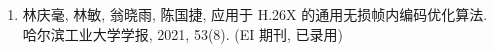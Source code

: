\begin{publications}
    \begin{enumerate}
        \item 林庆毫, 林敏, 翁晓雨, 陈国捷,
              应用于 H.26X 的通用无损帧内编码优化算法.\,
              哈尔滨工业大学学报, 2021, 53(8). (EI 期刊, 已录用)

    \end{enumerate}


\end{publications}
